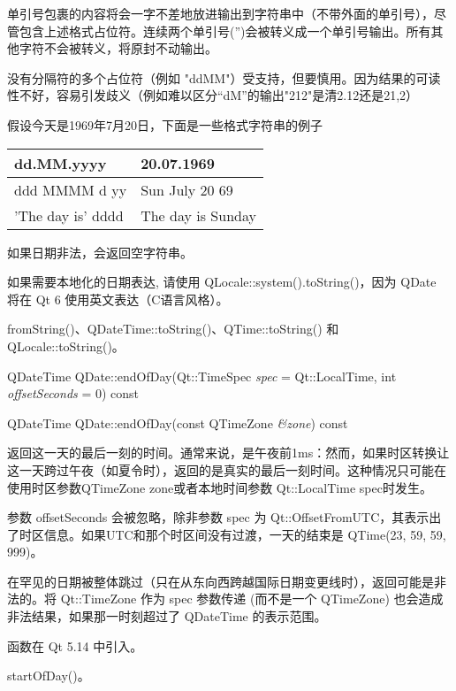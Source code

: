 单引号包裹的内容将会一字不差地放进输出到字符串中（不带外面的单引号），尽管包含上述格式占位符。连续两个单引号('')会被转义成一个单引号输出。所有其他字符不会被转义，将原封不动输出。

没有分隔符的多个占位符（例如 "ddMM"）受支持，但要慎用。因为结果的可读性不好，容易引发歧义（例如难以区分“dM”的输出"212"是清2.12还是21,2）

假设今天是1969年7月20日，下面是一些格式字符串的例子

\begin{tabular}{|l|l|}
\hline
dd.MM.yyyy	&20.07.1969\\
\hline
ddd MMMM d yy&	Sun July 20 69\\
\hline
'The day is' dddd&	The day is Sunday\\
\hline
\end{tabular}

如果日期非法，会返回空字符串。


\begin{notice}
如果需要本地化的日期表达, 请使用 QLocale::system().toString()，因为 QDate 将在 Qt 6 使用英文表达（C语言风格）。
\end{notice}


\begin{notice}[另请参阅]
fromString()、QDateTime::toString()、QTime::toString() 和
QLocale::toString()。
\end{notice}


\splitLine

QDateTime QDate::endOfDay(Qt::TimeSpec \emph{spec} = Qt::LocalTime, int \emph{offsetSeconds} = 0) const

QDateTime QDate::endOfDay(const QTimeZone \emph{\&zone}) const

返回这一天的最后一刻的时间。通常来说，是午夜前1ms：然而，如果时区转换让这一天跨过午夜（如夏令时），返回的是真实的最后一刻时间。这种情况只可能在使用时区参数QTimeZone zone或者本地时间参数 Qt::LocalTime spec时发生。

参数 offsetSeconds 会被忽略，除非参数 spec 为 Qt::OffsetFromUTC，其表示出了时区信息。如果UTC和那个时区间没有过渡，一天的结束是 QTime(23, 59, 59, 999)。

在罕见的日期被整体跳过（只在从东向西跨越国际日期变更线时），返回可能是非法的。将 Qt::TimeZone 作为 spec 参数传递 (而不是一个 QTimeZone) 也会造成非法结果，如果那一时刻超过了 QDateTime 的表示范围。

函数在 Qt 5.14 中引入。


\begin{notice}[另请参阅]
startOfDay()。
\end{notice}

